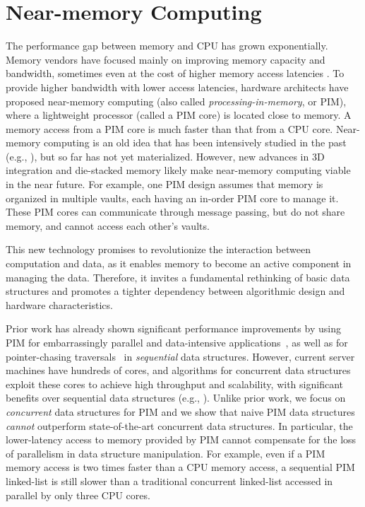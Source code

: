 \section{Near-memory Computing}

The performance gap between memory and CPU has grown exponentially.
Memory vendors have focused mainly on improving memory capacity and
bandwidth, sometimes even at the cost of higher memory access
latencies \cite{Chang:2016, DBLP:conf/hpca/LeeKSLSM13,
  DBLP:conf/hpca/LeeKPKSCM15, Chang:2017, Lee:2017}.  To provide
higher bandwidth with lower access latencies, hardware architects have
proposed near-memory computing (also called
\textit{processing-in-memory}, or PIM), where a lightweight processor
(called a PIM core) is located close to memory. A memory access from a
PIM core is much faster than that from a CPU core.  Near-memory
computing is an old idea that has been intensively studied in the past
(e.g., \cite{Stone1970, Kogge1994, Gokhale1995, Patterson1997,
  Oskin1998, KangHYKGLTP99, Hall1999, Elliott:1992}), but so far has
not yet materialized. However, new advances in 3D integration and
die-stacked memory likely make near-memory computing viable in the
near future.  For example, one PIM design \cite{Ahn2015:2,
  Zhang2014:TTP, Ahn2015:1, boroumand2016} assumes that memory is
organized in multiple vaults, each having an in-order PIM core to
manage it.  These PIM cores can communicate through message passing,
but do not share memory, and cannot access each other's vaults.

This new technology promises to revolutionize the interaction between
computation and data, as it enables memory to become an active
component in managing the data.  Therefore, it invites a fundamental
rethinking of basic data structures and promotes a tighter dependency
between algorithmic design and hardware characteristics.

Prior work has already shown significant performance improvements by
using PIM for embarrassingly parallel and data-intensive
applications~\cite{Zhang2014:TTP, Ahn2015:2, ZhuASSHPF13,
  Akin2015:DRM, Hsieh:2016:TOM}, as well as for pointer-chasing
traversals~\cite{hsieh2016accelerating,Hashemi:2016} in
\emph{sequential} data structures.  However, current server machines
have hundreds of cores, and algorithms for concurrent data structures
exploit these cores to achieve high throughput and scalability, with
significant benefits over sequential data structures (e.g.,
\cite{practicallf, skiplists-concpugh, valois, Herlihy08}).  Unlike
prior work, we focus on \emph{concurrent} data structures for PIM and
we show that naive PIM data structures \emph{cannot} outperform
state-of-the-art concurrent data structures.  In particular, the
lower-latency access to memory provided by PIM cannot compensate for
the loss of parallelism in data structure manipulation.  For example,
even if a PIM memory access is two times faster than a CPU memory
access, a sequential PIM linked-list is still slower than a
traditional concurrent linked-list accessed in parallel by only three
CPU cores.

